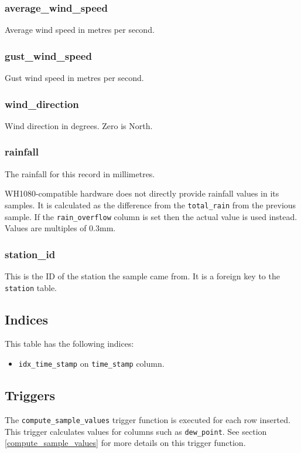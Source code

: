 \documentclass[a4paper,10pt]{book}
\begin{document}
\subsubsection{average\_wind\_speed}
Average wind speed in metres per second.

\subsubsection{gust\_wind\_speed}
Gust wind speed in metres per second.

\subsubsection{wind\_direction}
Wind direction in degrees. Zero is North.

\subsubsection{rainfall}
The rainfall for this record in millimetres.

WH1080-compatible hardware does not directly provide rainfall values in its samples. It is calculated as the difference from the \verb|total_rain| from the previous sample. If the \verb|rain_overflow| column is set then the actual value is used instead. Values are multiples of 0.3mm.

\subsubsection{station\_id}
This is the ID of the station the sample came from. It is a foreign key to the \verb|station| table.

\subsection{Indices}
This table has the following indices:
\begin{itemize}
\item \verb|idx_time_stamp| on \verb|time_stamp| column.
\end{itemize}

\subsection{Triggers}
The \verb|compute_sample_values| trigger function is executed for each row inserted. This trigger calculates values for columns such as \verb|dew_point|. See section \ref{compute_sample_values} for more details on this trigger function.
\end{document}
